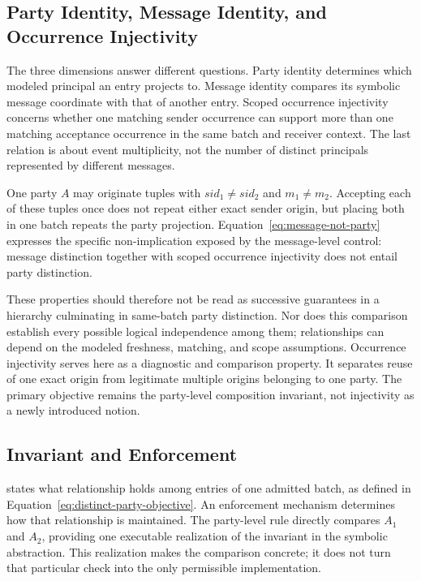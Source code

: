 \subsection{Party Identity, Message Identity, and Occurrence Injectivity}

The three dimensions answer different questions. Party identity determines
which modeled principal an entry projects to. Message identity compares its
symbolic message coordinate with that of another entry. Scoped occurrence
injectivity concerns whether one matching sender occurrence can support more
than one matching acceptance occurrence in the same batch and receiver
context. The last relation is about event multiplicity, not the number of
distinct principals represented by different messages.

One party \(A\) may originate tuples with
\(\mathit{sid}_1\neq\mathit{sid}_2\) and \(m_1\neq m_2\). Accepting each of
these tuples once does not repeat either exact sender origin, but placing
both in one batch repeats the party projection. Equation~\eqref{eq:message-not-party}
expresses the specific non-implication exposed by the message-level control:
message distinction together with scoped occurrence injectivity does not
entail party distinction.

These properties should therefore not be read as successive guarantees in a
hierarchy culminating in same-batch party distinction. Nor does this comparison establish
every possible logical independence among them; relationships can depend on
the modeled freshness, matching, and scope assumptions. Occurrence
injectivity serves here as a diagnostic and comparison property. It separates
reuse of one exact origin from legitimate multiple origins belonging to one
party. The primary objective remains the party-level composition invariant,
not injectivity as a newly introduced notion.

\subsection{Invariant and Enforcement}

\distinctparty states what relationship holds among entries of one admitted
batch, as defined in Equation~\eqref{eq:distinct-party-objective}. An
enforcement mechanism determines how that relationship is maintained. The
party-level rule directly compares \(A_1\) and \(A_2\), providing one
executable realization of the invariant in the symbolic abstraction. This
realization makes the comparison concrete; it does not turn that particular
check into the only permissible implementation.

